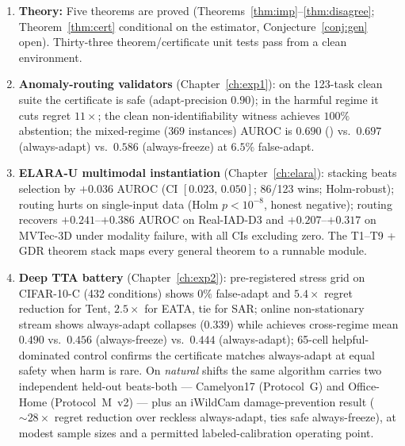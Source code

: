 \begin{enumerate}
\item \textbf{Theory:} Five theorems are proved (Theorems~\ref{thm:imp}--\ref{thm:disagree};
  Theorem~\ref{thm:cert} conditional on the estimator, Conjecture~\ref{conj:gen}
  open).  Thirty-three theorem/certificate unit tests pass from a clean environment.

\item \textbf{Anomaly-routing validators} (Chapter~\ref{ch:exp1}): on the 123-task
  clean suite the certificate is safe (adapt-precision $0.90$); in the harmful regime
  it cuts regret $11{\times}$; the clean non-identifiability witness achieves
  $100\%$ abstention; the mixed-regime ($369$ instances) AUROC is $0.690$ (\KGA{})
  vs.\ $0.697$ (always-adapt) vs.\ $0.586$ (always-freeze) at $6.5\%$ false-adapt.

\item \textbf{ELARA-U multimodal instantiation} (Chapter~\ref{ch:elara}): stacking
  beats selection by $+0.036$ AUROC (CI $[0.023,\, 0.050]$; 86/123 wins; Holm-robust);
  routing hurts on single-input data (Holm $p < 10^{-8}$, honest negative); routing
  recovers $+0.241$--$+0.386$ AUROC on Real-IAD-D3 and $+0.207$--$+0.317$ on MVTec-3D
  under modality failure, with all CIs excluding zero.  The T1--T9 + GDR theorem stack
  maps every general theorem to a runnable module.

\item \textbf{Deep TTA battery} (Chapter~\ref{ch:exp2}): pre-registered stress grid
  on CIFAR-10-C (432 conditions) shows $0\%$ false-adapt and $5.4{\times}$ regret
  reduction for Tent, $2.5{\times}$ for EATA, tie for SAR; online non-stationary
  stream shows always-adapt collapses ($0.339$) while \KGA{} achieves cross-regime
  mean $0.490$ vs.\ $0.456$ (always-freeze) vs.\ $0.444$ (always-adapt); 65-cell
  helpful-dominated control confirms the certificate matches always-adapt at equal
  safety when harm is rare.  On \emph{natural} shifts the same algorithm carries two
  independent held-out beats-both --- Camelyon17 (Protocol~G) and Office-Home
  (Protocol~M~v2) --- plus an iWildCam damage-prevention result (${\sim}28{\times}$
  regret reduction over reckless always-adapt, ties safe always-freeze), at modest
  sample sizes and a permitted labeled-calibration operating point.
\end{enumerate}

